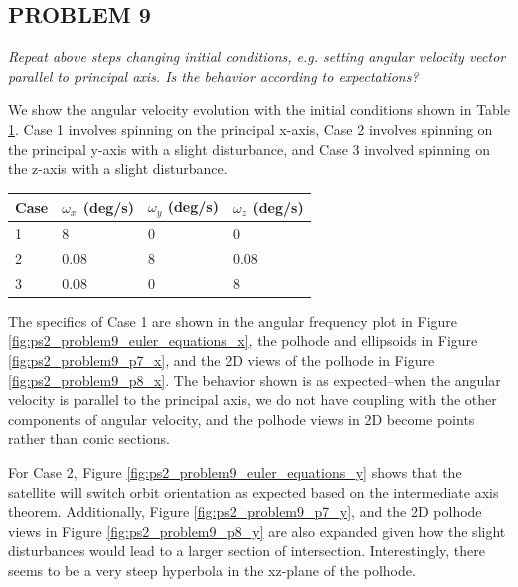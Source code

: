 \subsection{PROBLEM 9}
\textit{Repeat above steps changing initial conditions, e.g. setting angular velocity vector parallel to principal axis. Is the behavior according to expectations?}

We show the angular velocity evolution with the initial conditions shown in Table \ref{tab:initialConditions}. Case 1 involves spinning on the principal x-axis, Case 2 involves spinning on the principal y-axis with a slight disturbance, and Case 3 involved spinning on the z-axis with a slight disturbance.

\begin{table}[]
\label{tab:initialConditions}
\begin{tabular}{|l|l|l|l|}
\hline
\textbf{Case} & \textbf{$\omega_x$ (deg/s)} & \textbf{$\omega_y$ (deg/s)} & \textbf{$\omega_z$ (deg/s)} \\ \hline
1             & 8                     & 0                     & 0                     \\ \hline
2             & 0.08                  & 8                     & 0.08                  \\ \hline
3             & 0.08                  & 0                     & 8                     \\ \hline
\end{tabular}
\end{table}

The specifics of Case 1 are shown in the angular frequency plot in Figure \ref{fig:ps2_problem9_euler_equations_x}, the polhode and ellipsoids in Figure \ref{fig:ps2_problem9_p7_x}, and the 2D views of the polhode in Figure \ref{fig:ps2_problem9_p8_x}. The behavior shown is as expected–when the angular velocity is parallel to the principal axis, we do not have coupling with the other components of angular velocity, and the polhode views in 2D become points rather than conic sections.

For Case 2, Figure \ref{fig:ps2_problem9_euler_equations_y} shows that the satellite will switch orbit orientation as expected based on the intermediate axis theorem. Additionally, Figure \ref{fig:ps2_problem9_p7_y}, and the 2D polhode views in Figure \ref{fig:ps2_problem9_p8_y} are also expanded given how the slight disturbances would lead to a larger section of intersection. Interestingly, there seems to be a very steep hyperbola in the xz-plane of the polhode.

